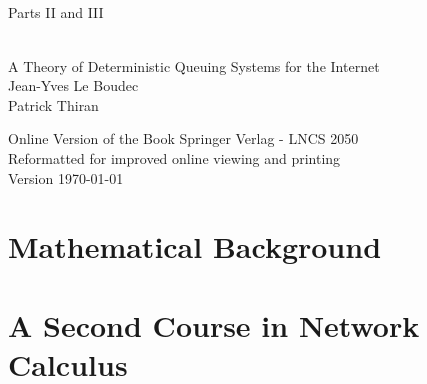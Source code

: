 \documentclass[11pt,twoside,onecolumn,a4paper]{book}
\begin{document}
\chapter*{~}
\begin{center}

 \\
 ~\\
 {\Huge {  Parts II and III  }}\\ ~\\
 {\LARGE
 A Theory of Deterministic Queuing Systems for the Internet\\


 {\sc Jean-Yves Le Boudec}  \\{\sc Patrick Thiran}\\
 \vspace{3cm}

 Online Version of the Book Springer Verlag - LNCS 2050\\
 Reformatted for improved online viewing and printing\\



 Version \today
 }


\end{center}
\part{Mathematical Background}

\part{A Second Course in Network Calculus}


\printindex
\end{document}
